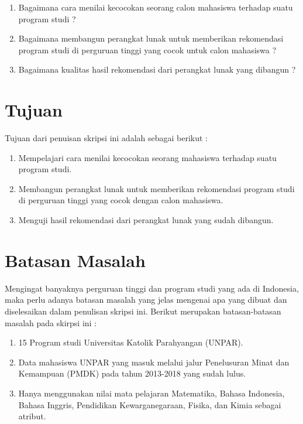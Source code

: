 \begin{enumerate}
	\item Bagaimana cara menilai kecocokan seorang calon mahasiswa terhadap suatu program studi ?
	\item Bagaimana membangun perangkat lunak untuk memberikan rekomendasi program studi di perguruan tinggi yang cocok untuk calon mahasiswa ?
	\item Bagaimana kualitas hasil rekomendasi dari perangkat lunak yang dibangun ?
\end{enumerate}

\section{Tujuan}
\label{sec:tujuan}
Tujuan dari penuisan skripsi ini adalah sebagai berikut : 

\begin{enumerate}
	\item Mempelajari cara menilai kecocokan seorang mahasiswa terhadap suatu program studi.
	\item Membangun perangkat lunak untuk memberikan rekomendasi program studi di perguruan tinggi yang cocok dengan calon mahasiswa.
	\item Menguji hasil rekomendasi dari perangkat lunak yang sudah dibangun.
\end{enumerate}


\section{Batasan Masalah}
\label{sec:batasan masalah}
Mengingat banyaknya perguruan tinggi dan program studi yang ada di Indonesia, maka perlu adanya batasan masalah yang jelas mengenai apa yang dibuat dan diselesaikan dalam penulisan skripsi ini. Berikut merupakan batasan-batasan masalah pada skirpsi ini : 

	\begin{enumerate}
		\item 15 Program studi Universitas Katolik Parahyangan (UNPAR).
		\item Data mahasiswa UNPAR yang masuk melalui jalur Penelusuran Minat dan Kemampuan (PMDK) pada tahun 2013-2018 yang sudah lulus.
		\item Hanya menggunakan nilai mata pelajaran Matematika, Bahasa Indonesia, Bahasa Inggris, Pendidikan Kewarganegaraan, Fisika, dan Kimia sebagai atribut.
	\end{enumerate}

